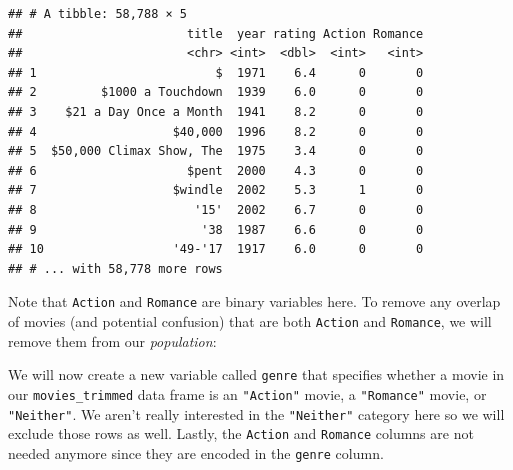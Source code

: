 \documentclass[]{tufte-book}
\newenvironment{Shaded}{\begin{snugshade}}{\end{snugshade}}
\newcommand{\KeywordTok}[1]{\textcolor[rgb]{0.13,0.29,0.53}{\textbf{{#1}}}}
\newcommand{\DataTypeTok}[1]{\textcolor[rgb]{0.13,0.29,0.53}{{#1}}}
\newcommand{\DecValTok}[1]{\textcolor[rgb]{0.00,0.00,0.81}{{#1}}}
\newcommand{\StringTok}[1]{\textcolor[rgb]{0.31,0.60,0.02}{{#1}}}
\newcommand{\NormalTok}[1]{{#1}}
\theoremstyle{definition}
\theoremstyle{definition}
\theoremstyle{remark}
\begin{document}
\begin{verbatim}
## # A tibble: 58,788 × 5
##                       title  year rating Action Romance
##                       <chr> <int>  <dbl>  <int>   <int>
## 1                         $  1971    6.4      0       0
## 2         $1000 a Touchdown  1939    6.0      0       0
## 3    $21 a Day Once a Month  1941    8.2      0       0
## 4                   $40,000  1996    8.2      0       0
## 5  $50,000 Climax Show, The  1975    3.4      0       0
## 6                     $pent  2000    4.3      0       0
## 7                   $windle  2002    5.3      1       0
## 8                      '15'  2002    6.7      0       0
## 9                       '38  1987    6.6      0       0
## 10                  '49-'17  1917    6.0      0       0
## # ... with 58,778 more rows
\end{verbatim}

Note that \texttt{Action} and \texttt{Romance} are binary variables
here. To remove any overlap of movies (and potential confusion) that are
both \texttt{Action} and \texttt{Romance}, we will remove them from our
\emph{population}:

\begin{Shaded}
\end{Shaded}

We will now create a new variable called \texttt{genre} that specifies
whether a movie in our \texttt{movies\_trimmed} data frame is an
\texttt{"Action"} movie, a \texttt{"Romance"} movie, or
\texttt{"Neither"}. We aren't really interested in the
\texttt{"Neither"} category here so we will exclude those rows as well.
Lastly, the \texttt{Action} and \texttt{Romance} columns are not needed
anymore since they are encoded in the \texttt{genre} column.

\begin{Shaded}
\end{Shaded}
\end{document}
